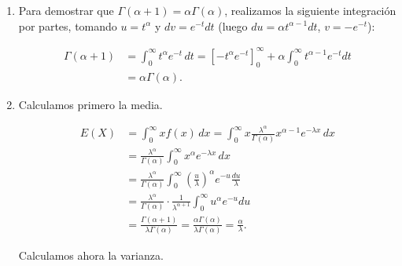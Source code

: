 \documentclass[
  spanish,
  a4paper,
]{scrreport}
\theoremstyle{definition}
\theoremstyle{remark}
\begin{document}
\begin{tcolorbox}[enhanced jigsaw, arc=.35mm, bottomrule=.15mm, bottomtitle=1mm, breakable, colback=white, colbacktitle=quarto-callout-tip-color!10!white, colframe=quarto-callout-tip-color-frame, coltitle=black, left=2mm, leftrule=.75mm, opacityback=0, opacitybacktitle=0.6, rightrule=.15mm, title=\textcolor{quarto-callout-tip-color}{\faLightbulb}\hspace{0.5em}{Solución}, titlerule=0mm, toprule=.15mm, toptitle=1mm]

\begin{enumerate}
\def\labelenumi{\alph{enumi}.}
\item
  Para demostrar que \(\Gamma(\alpha + 1) = \alpha \Gamma(\alpha)\),
  realizamos la siguiente integración por partes, tomando
  \(u = t^{\alpha}\) y \(dv = e^{-t} dt\) (luego
  \(du = \alpha t^{\alpha - 1} dt\), \(v = -e^{-t}\)):

  \begin{align*}
  \Gamma(\alpha + 1)
  &= \int_0^{\infty} t^{\alpha} e^{-t}\, dt 
  = \left[ -t^{\alpha}e^{-t}\right]_{0}^{\infty} + \alpha \int_0^{\infty} t^{\alpha - 1} e^{-t} dt \\
  &= \alpha \Gamma(\alpha).
  \end{align*}
\item
  Calculamos primero la media.

  \begin{align*}
  E(X) 
  &= \int_0^{\infty} x f(x)\, dx
  = \int_0^{\infty} x \frac{\lambda^{\alpha}}{\Gamma(\alpha)}x^{\alpha - 1}e^{-\lambda x}\, dx \\
  &= \frac{\lambda^{\alpha}}{\Gamma(\alpha)} \int_0^{\infty} x^{\alpha} e^{-\lambda x}\, dx
  \tag{Cambio $u = \lambda x$} \\
  &= \frac{\lambda^{\alpha}}{\Gamma(\alpha)} \int_0^{\infty} \left(\frac{u}{\lambda}\right)^{\alpha} e^{-u} \frac{du}{\lambda} \\
  &= \frac{\lambda^{\alpha}}{\Gamma(\alpha)} \cdot \frac{1}{\lambda^{\alpha + 1}} \int_0^{\infty} u^{\alpha} e^{-u} du \\
  &= \frac{\Gamma(\alpha + 1)}{\lambda \Gamma(\alpha)} 
  = \frac{\alpha \Gamma(\alpha)}{\lambda \Gamma(\alpha)} 
  = \frac{\alpha}{\lambda}.
  \end{align*}

  Calculamos ahora la varianza.


\end{enumerate}
\end{tcolorbox}
\end{document}
